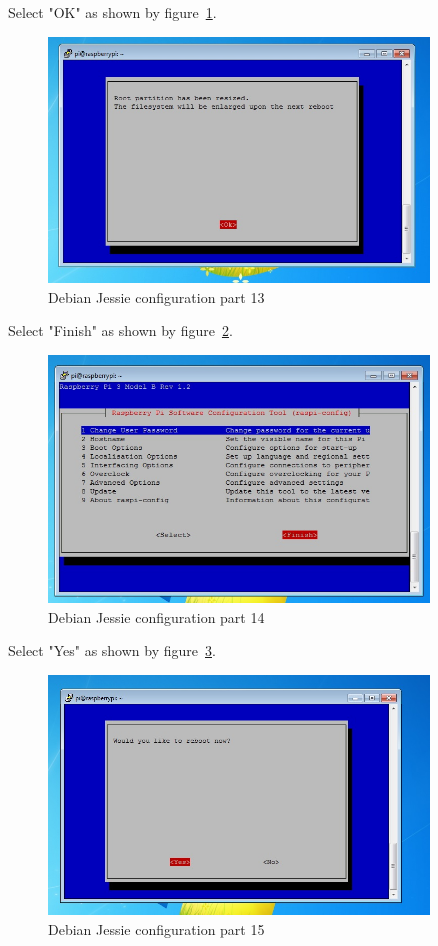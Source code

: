 \documentclass[12pt,]{article}
\begin{document}
Select "OK" as shown by figure~\ref{fig:30}.
\begin{figure}[H]
  	\begin{center}
    	\includegraphics[width=0.9\textwidth]{Ras_12}
  	\end{center}
  	\caption{Debian Jessie configuration part 13}
	\label{fig:30}
\end{figure}
Select "Finish" as shown by figure~\ref{fig:31}.
\begin{figure}[H]
  	\begin{center}
    	\includegraphics[width=0.9\textwidth]{Ras_13}
  	\end{center}
  	\caption{Debian Jessie configuration part 14}
	\label{fig:31}
\end{figure}
Select "Yes" as shown by figure~\ref{fig:32}.
\begin{figure}[H]
  	\begin{center}
    	\includegraphics[width=0.9\textwidth]{Ras_14}
  	\end{center}
  	\caption{Debian Jessie configuration part 15}
	\label{fig:32}
\end{figure}
\end{document}
